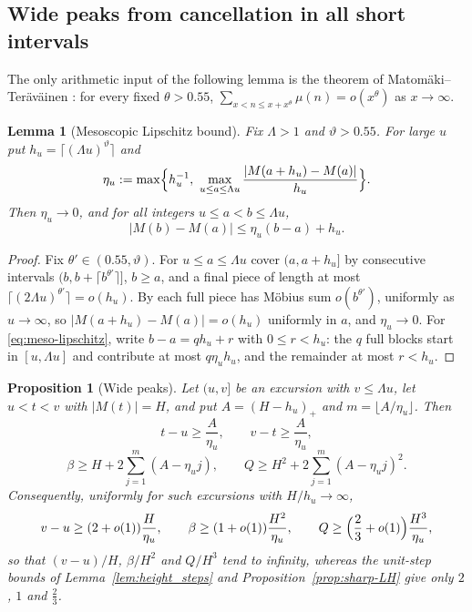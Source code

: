\documentclass[11pt]{amsart}
\numberwithin{equation}{section}
\theoremstyle{plain}
\newtheorem{proposition}[theorem]{Proposition}
\newtheorem{lemma}[theorem]{Lemma}
\theoremstyle{definition}
\theoremstyle{remark}
\begin{document}
\subsection*{Wide peaks from cancellation in all short intervals}

The only arithmetic input of the following lemma is the theorem of
Matom\"aki--Ter\"av\"ainen \cite{MatomakiTeravainen2023}: for every fixed
$\theta>0.55$, $\sum_{x<n\le x+x^\theta}\mu(n)=o(x^\theta)$ as $x\to\infty$.

\begin{lemma}[Mesoscopic Lipschitz bound]
\label{lem:meso-lipschitz}
Fix $\Lambda>1$ and $\vartheta>0.55$. For large $u$ put
$h_u=\lceil(\Lambda u)^\vartheta\rceil$ and
\[
\eta_u:=\max\Bigl\{h_u^{-1},\ \max_{u\le a\le\Lambda u}
\frac{|M(a+h_u)-M(a)|}{h_u}\Bigr\}.
\]
Then $\eta_u\to0$, and for all integers $u\le a<b\le\Lambda u$,
\begin{equation}
\label{eq:meso-lipschitz}
|M(b)-M(a)|\le\eta_u(b-a)+h_u .
\end{equation}
\end{lemma}

\begin{proof}
Fix $\theta'\in(0.55,\vartheta)$. For $u\le a\le\Lambda u$ cover $(a,a+h_u]$
by consecutive intervals $(b,b+\lceil b^{\theta'}\rceil]$, $b\ge a$, and a
final piece of length at most $\lceil(2\Lambda u)^{\theta'}\rceil=o(h_u)$.
By \cite{MatomakiTeravainen2023} each full piece has Möbius sum
$o(b^{\theta'})$, uniformly as $u\to\infty$, so
$|M(a+h_u)-M(a)|=o(h_u)$ uniformly in $a$, and $\eta_u\to0$. For
\eqref{eq:meso-lipschitz}, write $b-a=qh_u+r$ with $0\le r<h_u$: the $q$
full blocks start in $[u,\Lambda u]$ and contribute at most $q\eta_uh_u$,
and the remainder at most $r<h_u$.
\end{proof}

\begin{proposition}[Wide peaks]
\label{prop:wide-peaks}
Let $(u,v]$ be an excursion with $v\le\Lambda u$, let $u<t<v$ with
$|M(t)|=H$, and put $A=(H-h_u)_+$ and $m=\lfloor A/\eta_u\rfloor$. Then
\[
t-u\ge\frac A{\eta_u},\qquad v-t\ge\frac A{\eta_u},
\]
\[
\beta\ge H+2\sum_{j=1}^m(A-\eta_uj),\qquad
Q\ge H^2+2\sum_{j=1}^m(A-\eta_uj)^2 .
\]
Consequently, uniformly for such excursions with $H/h_u\to\infty$,
\[
v-u\ge(2+o(1))\frac H{\eta_u},\qquad
\beta\ge(1+o(1))\frac{H^2}{\eta_u},\qquad
Q\ge\Bigl(\frac23+o(1)\Bigr)\frac{H^3}{\eta_u},
\]
so that $(v-u)/H$, $\beta/H^2$ and $Q/H^3$ tend to infinity, whereas the
unit-step bounds of Lemma~\ref{lem:height_steps} and
Proposition~\ref{prop:sharp-LH} give only $2$, $1$ and $\frac23$.
\end{proposition}
\end{document}
